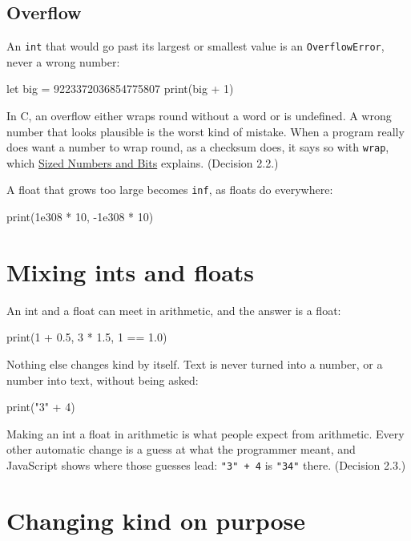 \subsection{Overflow}

An \verb|int| that would go past its largest or smallest value is an
\verb|OverflowError|, never a wrong number:

\begin{zeno}[fails=yes]
let big = 9223372036854775807
print(big + 1)
\end{zeno}

\begin{why}
In C, an overflow either wraps round without a word or is undefined.
A wrong number that looks plausible is the worst kind of mistake.
When a program really does want a number to wrap round, as a checksum
does, it says so with \verb|wrap|, which
\hyperref[ch-sized-numbers]{Sized Numbers and Bits} explains.
(Decision 2.2.)
\end{why}

A float that grows too large becomes \verb|inf|, as floats do
everywhere:

\begin{zeno}
print(1e308 * 10, -1e308 * 10)
\end{zeno}

\section{Mixing ints and floats}

An int and a float can meet in arithmetic, and the answer is a float:

\begin{zeno}
print(1 + 0.5, 3 * 1.5, 1 == 1.0)
\end{zeno}

Nothing else changes kind by itself. Text is never turned into a
number, or a number into text, without being asked:

\begin{zeno}[fails=yes]
print("3" + 4)
\end{zeno}

\begin{why}
Making an int a float in arithmetic is what people expect from
arithmetic. Every other automatic change is a guess at what the
programmer meant, and JavaScript shows where those guesses lead:
\verb|"3" + 4| is \verb|"34"| there. (Decision 2.3.)
\end{why}

\section{Changing kind on purpose}

